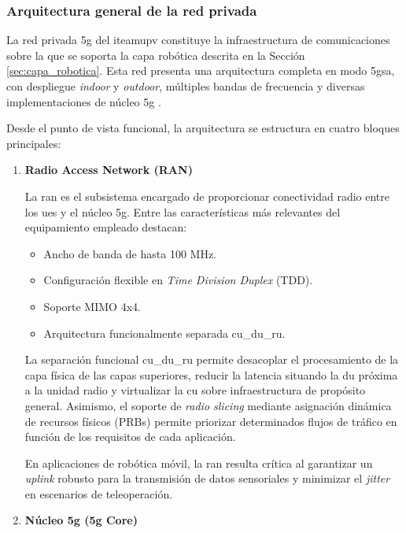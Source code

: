 \subsubsection{Arquitectura general de la red privada}

La red privada \gls{5g} del \gls{iteamupv} constituye la infraestructura de comunicaciones sobre la que se soporta la capa robótica descrita en la Sección \ref{sec:capa_robotica}. Esta red presenta una arquitectura completa en modo \gls{5gsa}, con despliegue \textit{indoor} y \textit{outdoor}, múltiples bandas de frecuencia y diversas implementaciones de núcleo \gls{5g} \cite{ITEAM2025Private5G}.

Desde el punto de vista funcional, la arquitectura se estructura en cuatro bloques principales:

\begin{enumerate}
    \item \textbf{Radio Access Network (RAN)}

    La \gls{ran} es el subsistema encargado de proporcionar conectividad radio entre los \gls{ues} y el núcleo \gls{5g}. Entre las características más relevantes del equipamiento empleado destacan:

    \begin{itemize}
        \item Ancho de banda de hasta 100 MHz.
        \item Configuración flexible en \textit{Time Division Duplex} (TDD).
        \item Soporte MIMO 4x4.
        \item Arquitectura funcionalmente separada \gls{cu_du_ru}.
    \end{itemize}

    La separación funcional \gls{cu_du_ru} permite desacoplar el procesamiento de la capa física de las capas superiores, reducir la latencia situando la \gls{du} próxima a la unidad radio y virtualizar la \gls{cu} sobre infraestructura de propósito general. Asimismo, el soporte de \textit{radio slicing} mediante asignación dinámica de recursos físicos (PRBs) permite priorizar determinados flujos de tráfico en función de los requisitos de cada aplicación.

    En aplicaciones de robótica móvil, la \gls{ran} resulta crítica al garantizar un \textit{uplink} robusto para la transmisión de datos sensoriales y minimizar el \textit{jitter} en escenarios de teleoperación.

    \item \textbf{Núcleo \gls{5g} (\gls{5g} Core)}


\end{enumerate}
